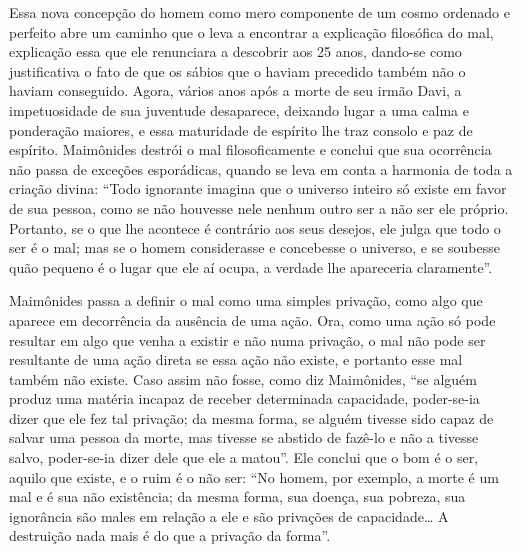 Essa nova concepção do homem como mero componente de um cosmo ordenado e
perfeito abre um caminho que o leva a encontrar a explicação filosófica
do mal, explicação essa que ele renunciara a descobrir aos 25 anos,
dando-se como justificativa o fato de que os sábios que o haviam
precedido também não o haviam conseguido. Agora, vários anos após a
morte de seu irmão Davi, a impetuosidade de sua juventude desaparece,
deixando lugar a uma calma e ponderação maiores, e essa maturidade de
espírito lhe traz consolo e paz de espírito. Maimônides destrói o mal
filosoficamente e conclui que sua ocorrência não passa de exceções
esporádicas, quando se leva em conta a harmonia de toda a criação
divina: ``Todo ignorante imagina que o universo inteiro só existe em favor 
de sua pessoa, como se não houvesse nele nenhum
outro ser a não ser ele próprio. Portanto, se o que lhe acontece é
contrário aos seus desejos, ele julga que todo o ser é o mal; mas se o
homem considerasse e concebesse o universo, e se soubesse quão pequeno é
o lugar que ele aí ocupa, a verdade lhe apareceria claramente''.

Maimônides passa a definir o mal como uma simples privação, como algo
que aparece em decorrência da ausência de uma ação. Ora, como uma ação
só pode resultar em algo que venha a existir e não numa privação, o mal
não pode ser resultante de uma ação direta se essa ação não existe, e
portanto esse mal também não existe. Caso assim não fosse, como diz
Maimônides, ``se alguém produz uma matéria incapaz de receber
determinada capacidade, poder-se-ia dizer que ele fez tal privação; da
mesma forma, se alguém tivesse sido capaz de salvar uma pessoa da
morte, mas tivesse se abstido de fazê-lo e não a tivesse salvo,
poder-se-ia dizer dele que ele a matou''. Ele conclui que o bom é o ser,
aquilo que existe, e o ruim é o não ser: ``No homem, por exemplo, a
morte é um mal e é sua não existência; da mesma forma, sua doença, sua
pobreza, sua ignorância são males em relação a ele e são privações de
capacidade\ldots{} A destruição nada mais é do que a privação da forma''.

